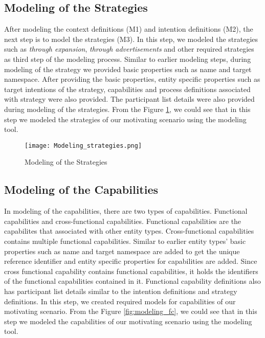 \subsection{Modeling of the Strategies}
After modeling the context definitions (M1) and intention definitions (M2), the next step is to model the strategies (M3). In this step, we modeled the strategies such as \textit{through expansion}, \textit{through advertisements} and other required strategies as third step of the modeling process. Similar to earlier modeling steps, during modeling of the strategy we provided basic properties such as name and target namespace. After providing the basic properties, entity specific properties such as target intentions of the strategy, capabilities and process definitions associated with strategy were also provided. The participant list details were also provided during modeling of the strategies. From the Figure \ref{fig:modeling_strategies}, we could see that in this step we modeled the strategies of our motivating scenario using the modeling tool. 

\begin{figure} [H]
	\centering
	\texttt{[image: Modeling\_strategies.png]}
	\caption{Modeling of the Strategies}
	\label{fig:modeling_strategies}
\end{figure}

\subsection{Modeling of the Capabilities}
In modeling of the capabilities, there are two types of capabilities. Functional capabilities and cross-functional capabilities. Functional capabilities are the capabilites that associated with other entity types. Cross-functional capabilities contains multiple functional capabilities. Similar to earlier entity types' basic properties such as name and target namespace are added to get the unique reference identifier and entity specific properties for capabilities are added. Since cross functional capability contains functional capabilities, it holds the identifiers of the functional capabilities contained in it. Functional capability definitions also has participant list details similar to the intention definitions and strategy definitions. In this step, we created required models for capabilities of our motivating scenario. From the Figure \ref{fig:modeling_fc}, we could see that in this step we modeled the capabilities of our motivating scenario using the modeling tool. 

